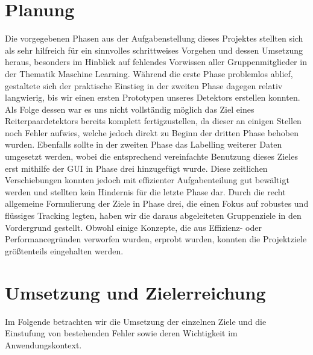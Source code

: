 \section{Planung}
Die vorgegebenen Phasen aus der Aufgabenstellung dieses Projektes stellten sich als sehr hilfreich für ein sinnvolles schrittweises Vorgehen und dessen Umsetzung heraus, besonders im Hinblick auf fehlendes Vorwissen aller Gruppenmitglieder in der Thematik Maschine Learning. Während die erste Phase problemlos ablief, gestaltete sich der praktische Einstieg in der zweiten Phase dagegen relativ langwierig, bis wir einen ersten Prototypen unseres Detektors erstellen konnten. Als Folge dessen war es uns nicht vollständig möglich das Ziel eines Reiterpaardetektors bereits komplett fertigzustellen, da dieser an einigen Stellen noch Fehler aufwies, welche jedoch direkt zu Beginn der dritten Phase behoben wurden. Ebenfalls sollte in der zweiten Phase das Labelling weiterer Daten umgesetzt werden, wobei die entsprechend vereinfachte Benutzung dieses Zieles erst mithilfe der GUI in Phase drei hinzugefügt wurde. Diese zeitlichen Verschiebungen konnten jedoch  mit effizienter Aufgabenteilung gut bewältigt werden und stellten kein Hindernis für die letzte Phase dar.
Durch die recht allgemeine Formulierung der Ziele in Phase drei, die einen Fokus auf robustes und flüssiges Tracking legten, haben wir die daraus abgeleiteten Gruppenziele in den Vordergrund gestellt. Obwohl einige Konzepte, die aus Effizienz- oder Performancegründen verworfen wurden, erprobt wurden, konnten die Projektziele größtenteils eingehalten werden. 

\section{Umsetzung und Zielerreichung}
Im Folgende betrachten wir die Umsetzung der einzelnen Ziele und die Einstufung von bestehenden Fehler sowie deren Wichtigkeit im Anwendungskontext.



